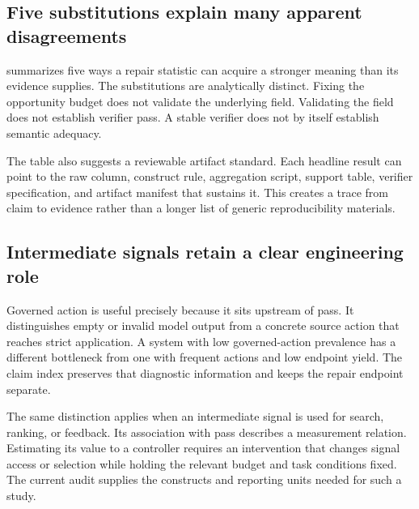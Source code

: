 \subsection{Five substitutions explain many apparent disagreements}

 summarizes five ways a repair statistic can acquire a stronger meaning than its evidence supplies. The substitutions are analytically distinct. Fixing the opportunity budget does not validate the underlying field. Validating the field does not establish verifier pass. A stable verifier does not by itself establish semantic adequacy.



The table also suggests a reviewable artifact standard. Each headline result can point to the raw column, construct rule, aggregation script, support table, verifier specification, and artifact manifest that sustains it. This creates a trace from claim to evidence rather than a longer list of generic reproducibility materials.

\subsection{Intermediate signals retain a clear engineering role}

Governed action is useful precisely because it sits upstream of pass. It distinguishes empty or invalid model output from a concrete source action that reaches strict application. A system with low governed-action prevalence has a different bottleneck from one with frequent actions and low endpoint yield. The claim index preserves that diagnostic information and keeps the repair endpoint separate.

The same distinction applies when an intermediate signal is used for search, ranking, or feedback. Its association with pass describes a measurement relation. Estimating its value to a controller requires an intervention that changes signal access or selection while holding the relevant budget and task conditions fixed. The current audit supplies the constructs and reporting units needed for such a study.
